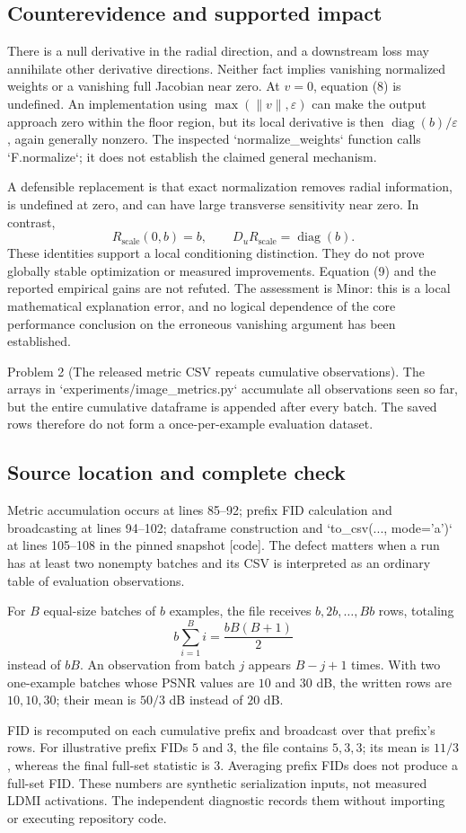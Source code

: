 \documentclass[10pt]{article}
\begin{document}
\subsection*{Counterevidence and supported impact}
There is a null derivative in the radial direction, and a downstream loss may annihilate other derivative directions. Neither fact implies vanishing normalized weights or a vanishing full Jacobian near zero. At \(v=0\), equation (8) is undefined. An implementation using \(\max(\|v\|,\varepsilon)\) can make the output approach zero within the floor region, but its local derivative is then \(\operatorname{diag}(b)/\varepsilon\), again generally nonzero. The inspected `normalize\_weights` function calls `F.normalize`; it does not establish the claimed general mechanism.\par
A defensible replacement is that exact normalization removes radial information, is undefined at zero, and can have large transverse sensitivity near zero. In contrast, \[R_{\mathrm{scale}}(0,b)=b,\qquad
 D_uR_{\mathrm{scale}}=\operatorname{diag}(b).\] These identities support a local conditioning distinction. They do not prove globally stable optimization or measured improvements. Equation (9) and the reported empirical gains are not refuted. The assessment is Minor: this is a local mathematical explanation error, and no logical dependence of the core performance conclusion on the erroneous vanishing argument has been established.\par
Problem 2 (The released metric CSV repeats cumulative observations).  The arrays in `experiments/image\_metrics.py` accumulate all observations seen so far, but the entire cumulative dataframe is appended after every batch. The saved rows therefore do not form a once-per-example evaluation dataset.\par
\subsection*{Source location and complete check}
Metric accumulation occurs at lines 85–92; prefix FID calculation and broadcasting at lines 94–102; dataframe construction and `to\_csv(..., mode=’a’)` at lines 105–108 in the pinned snapshot [code]. The defect matters when a run has at least two nonempty batches and its CSV is interpreted as an ordinary table of evaluation observations.\par
For \(B\) equal-size batches of \(b\) examples, the file receives \(b,2b,\ldots,Bb\) rows, totaling \[b\sum_{i=1}^B i=\frac{bB(B+1)}2\] instead of \(bB\). An observation from batch \(j\) appears \(B-j+1\) times. With two one-example batches whose PSNR values are \(10\) and \(30\) dB, the written rows are \(10,10,30\); their mean is \(50/3\) dB instead of \(20\) dB.\par
FID is recomputed on each cumulative prefix and broadcast over that prefix’s rows. For illustrative prefix FIDs \(5\) and \(3\), the file contains \(5,3,3\); its mean is \(11/3\), whereas the final full-set statistic is \(3\). Averaging prefix FIDs does not produce a full-set FID. These numbers are synthetic serialization inputs, not measured LDMI activations. The independent diagnostic records them without importing or executing repository code.\par
\end{document}
